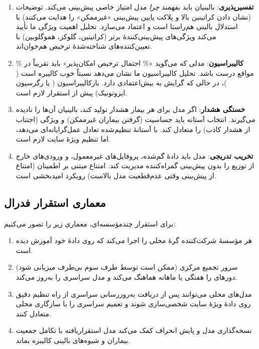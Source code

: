 \begin{enumerate}
\item \textbf{تفسیرپذیری}: بالینیان باید بفهمند \emph{چرا} مدل امتیاز خاصی پیش‌بینی می‌کند. توضیحات  (نشان دادن کراتینین بالا و پلاکت پایین پیش‌بینی «غیرممکن» را هدایت می‌کنند) با استدلال بالینی هم‌راستا است و اعتماد می‌سازد. تحلیل اهمیت ویژگی ما تأیید می‌کند ویژگی‌های پیش‌بینی‌کنندۀ برتر (کراتینین، گلوکز، هموگلوبین) با تعیین‌کننده‌های شناخته‌شدۀ ترخیص هم‌خوان‌اند.

\item \textbf{کالیبراسیون}: مدلی که می‌گوید «\% احتمال ترخیص امکان‌پذیر» باید تقریباً در \% مواقع درست باشد. تحلیل کالیبراسیون ما نشان می‌دهد  نسبتاً خوب کالیبره است ( )، در حالی که  گرایش به بیش‌اعتمادی دارد. بازکالیبراسیون ( یا رگرسیون ایزوتونیک) پیش از استقرار لازم است.

\item \textbf{خستگی هشدار}: اگر مدل برای هر بیمار هشدار تولید کند، بالینیان آن‌ها را نادیده می‌گیرند. انتخاب آستانه باید حساسیت (گرفتن بیماران غیرممکن) و ویژگی (اجتناب از هشدار کاذب) را متعادل کند.  با آستانۀ تنظیم‌شده  تعادل عمل‌گرایانه‌ای می‌دهد، اما تنظیم ویژۀ سایت لازم است.

\item \textbf{تخریب تدریجی}: مدل باید دادۀ گم‌شده، پروفایل‌های غیرمعمول، و ورودی‌های خارج از توزیع را بدون پیش‌بینی گمراه‌کننده مدیریت کند. امتناع مبتنی بر اطمینان (امتناع از پیش‌بینی وقتی عدم‌قطعیت مدل بالاست) رویکرد امیدبخشی است.
\end{enumerate}

\subsection{معماری استقرار فدرال}

برای استقرار چندمؤسسه‌ای، معماری زیر را تصور می‌کنیم:

\begin{enumerate}
\item هر مؤسسۀ شرکت‌کننده گرۀ محلی  را اجرا می‌کند که روی دادۀ خود آموزش دیده است.
\item سرور تجمیع مرکزی (ممکن است توسط طرف سوم بی‌طرف میزبانی شود) دورهای  را هفتگی یا ماهانه هماهنگ می‌کند و مدل سراسری را به‌روز می‌کند.
\item مدل‌های محلی می‌توانند پس از دریافت به‌روزرسانی سراسری از راه تنظیم دقیق روی دادۀ ویژۀ سایت شخصی‌سازی شوند و تعمیم سراسری را با سازگاری محلی متعادل کنند.
\item نسخه‌گذاری مدل و پایش انحراف کمک می‌کند مدل استقراریافته با تکامل جمعیت بیماران و شیوه‌های بالینی کالیبره بماند.
\end{enumerate}

